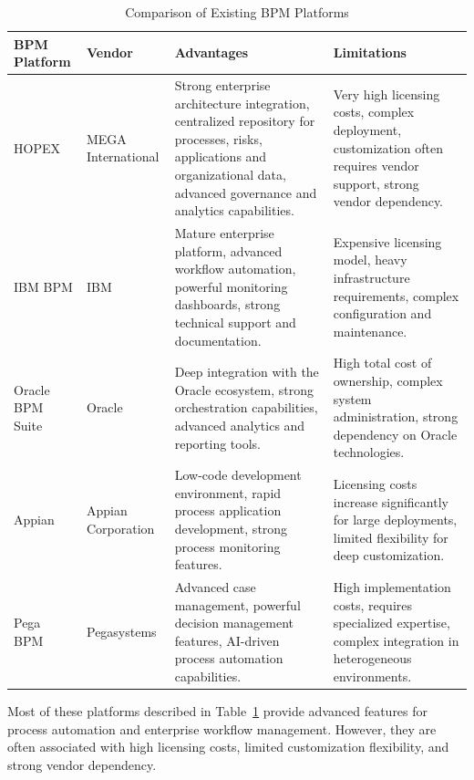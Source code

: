 \begin{table}[h!]
\centering
\caption{Comparison of Existing BPM Platforms}
\label{tab:comparaison}
\renewcommand{\arraystretch}{1.5}
\begin{tabular}{|p{2cm}|p{3cm}|p{5cm}|p{5cm}|}
\hline
\textbf{BPM Platform} & \textbf{Vendor} & \textbf{Advantages} & \textbf{Limitations} \\
\hline

HOPEX & MEGA International &
Strong enterprise architecture integration, centralized repository for processes, risks, applications and organizational data, advanced governance and analytics capabilities. &
Very high licensing costs, complex deployment, customization often requires vendor support, strong vendor dependency. \\
\hline

IBM BPM & IBM &
Mature enterprise platform, advanced workflow automation, powerful monitoring dashboards, strong technical support and documentation. &
Expensive licensing model, heavy infrastructure requirements, complex configuration and maintenance. \\
\hline

Oracle BPM Suite & Oracle &
Deep integration with the Oracle ecosystem, strong orchestration capabilities, advanced analytics and reporting tools. &
High total cost of ownership, complex system administration, strong dependency on Oracle technologies. \\
\hline

Appian & Appian Corporation &
Low-code development environment, rapid process application development, strong process monitoring features. &
Licensing costs increase significantly for large deployments, limited flexibility for deep customization. \\
\hline

Pega BPM & Pegasystems &
Advanced case management, powerful decision management features, AI-driven process automation capabilities. &
High implementation costs, requires specialized expertise, complex integration in heterogeneous environments. \\
\hline

\end{tabular}
\end{table}

Most of these platforms described in Table~\ref{tab:comparaison} provide advanced features for process automation and enterprise workflow management. However, they are often associated with high licensing costs, limited customization flexibility, and strong vendor dependency.

